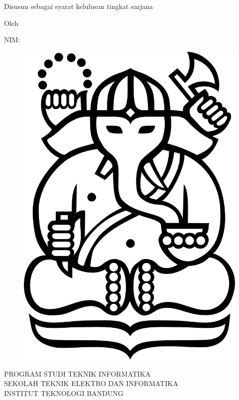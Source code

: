 \clearpage
\pagestyle{empty}

\begin{center}
\smallskip

    \Large \bfseries
    \judul
    \vfill

    \Large \context
    \vfill

    \large Disusun sebagai syarat kelulusan tingkat sarjana
    \vfill

    \large Oleh

    \Large \penulis

    \Large NIM: \nimpenulis

    \vfill
    \begin{figure}[h]
        \centering
        \includegraphics[scale=0.15]{resources/cover-ganesha}
    \end{figure}
    \vfill

    \large
    \uppercase{
        Program Studi Teknik Informatika \\
        Sekolah Teknik Elektro dan Informatika \\
        Institut Teknologi Bandung
    }

    \bulan\ \tahun

\end{center}

\clearpage
